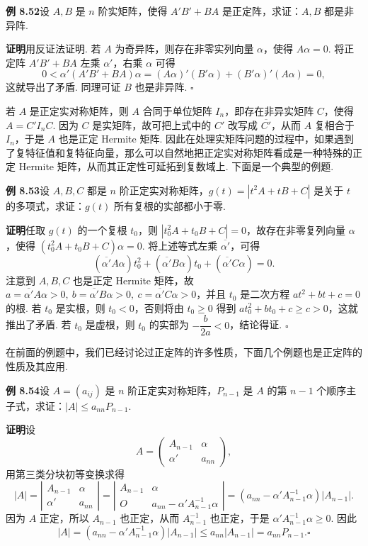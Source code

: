 \documentclass[UTF8, 12pt, fontset=fandol, oneside]{ctexart}
\begin{document}
\noindent\textbf{例 8.52}\quad 设 $A,B$ 是 $n$ 阶实矩阵，使得 $A'B'+BA$ 是正定阵，求证：$A,B$ 都是非异阵.

\noindent\textbf{证明}\quad 用反证法证明. 若 $A$ 为奇异阵，则存在非零实列向量 $\alpha$，使得 $A\alpha=0$. 将正定阵 $A'B'+BA$ 左乘 $\alpha'$，右乘 $\alpha$ 可得
\[
0<\alpha'(A'B'+BA)\alpha=(A\alpha)'(B'\alpha)+(B'\alpha)'(A\alpha)=0,
\]
这就导出了矛盾. 同理可证 $B$ 也是非异阵. $\ensuremath{\square}$

若 $A$ 是正定实对称矩阵，则 $A$ 合同于单位矩阵 $I_n$，即存在非异实矩阵 $C$，使得 $A=C'I_nC$. 因为 $C$ 是实矩阵，故可把上式中的 $C'$ 改写成 $\overline{C'}$，从而 $A$ 复相合于 $I_n$，于是 $A$ 也是正定 Hermite 矩阵. 因此在处理实矩阵问题的过程中，如果遇到了复特征值和复特征向量，那么可以自然地把正定实对称矩阵看成是一种特殊的正定 Hermite 矩阵，从而其正定性可延拓到复数域上. 下面是一个典型的例题.

\noindent\textbf{例 8.53}\quad 设 $A,B,C$ 都是 $n$ 阶正定实对称矩阵，$g(t)=|t^2A+tB+C|$ 是关于 $t$ 的多项式，求证：$g(t)$ 所有复根的实部都小于零.

\noindent\textbf{证明}\quad 任取 $g(t)$ 的一个复根 $t_0$，则 $|t_0^2A+t_0B+C|=0$，故存在非零复列向量 $\alpha$，使得 $(t_0^2A+t_0B+C)\alpha=0$. 将上述等式左乘 $\overline{\alpha'}$，可得
\[
(\overline{\alpha'}A\alpha)t_0^2+(\overline{\alpha'}B\alpha)t_0+(\overline{\alpha'}C\alpha)=0.
\]
注意到 $A,B,C$ 也是正定 Hermite 矩阵，故 $a=\overline{\alpha'}A\alpha>0,\ b=\overline{\alpha'}B\alpha>0,\ c=\overline{\alpha'}C\alpha>0$，并且 $t_0$ 是二次方程 $at^2+bt+c=0$ 的根. 若 $t_0$ 是实根，则 $t_0<0$，否则将由 $t_0\ge 0$ 得到 $at_0^2+bt_0+c\ge c>0$，这就推出了矛盾. 若 $t_0$ 是虚根，则 $t_0$ 的实部为 $-\dfrac{b}{2a}<0$，结论得证. $\ensuremath{\square}$

在前面的例题中，我们已经讨论过正定阵的许多性质，下面几个例题也是正定阵的性质及其应用.

\noindent\textbf{例 8.54}\quad 设 $A=(a_{ij})$ 是 $n$ 阶正定实对称矩阵，$P_{n-1}$ 是 $A$ 的第 $n-1$ 个顺序主子式，求证：$|A|\le a_{nn}P_{n-1}$.

\noindent\textbf{证明}\quad 设
\[
A=\left(\begin{array}{cc}
A_{n-1} & \alpha\\
\alpha' & a_{nn}
\end{array}\right),
\]
用第三类分块初等变换求得
\[
|A|=
\left|\begin{array}{cc}
A_{n-1} & \alpha\\
\alpha' & a_{nn}
\end{array}\right|
=
\left|\begin{array}{cc}
A_{n-1} & \alpha\\
O & a_{nn}-\alpha'A_{n-1}^{-1}\alpha
\end{array}\right|
=(a_{nn}-\alpha'A_{n-1}^{-1}\alpha)|A_{n-1}|.
\]
因为 $A$ 正定，所以 $A_{n-1}$ 也正定，从而 $A_{n-1}^{-1}$ 也正定，于是 $\alpha'A_{n-1}^{-1}\alpha\ge 0$. 因此
\[
|A|=(a_{nn}-\alpha'A_{n-1}^{-1}\alpha)|A_{n-1}|\le a_{nn}|A_{n-1}|=a_{nn}P_{n-1}. \ensuremath{\square}
\]
\end{document}
